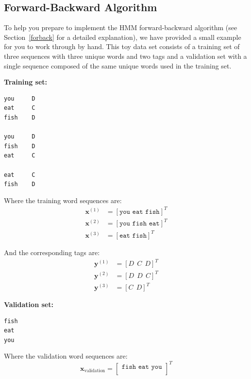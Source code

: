 \documentclass[11pt,addpoints,answers]{exam}
\begin{document}
\clearpage

\subsection{Forward-Backward Algorithm}

\begin{questions}  \label{hmm-problem}
\question[14] To help you prepare to implement the HMM forward-backward algorithm (see Section~\ref{forback} for a detailed explanation), we have provided a small example for you to work through by hand. This toy data set consists of a training set of three sequences with three unique words and two tags and a validation set with a single sequence composed of the same unique words used in the training set. 

\textbf{Training set:} 
\begin{verbatim}
you     D
eat     C
fish    D

you     D
fish    D
eat     C

eat     C
fish    D
\end{verbatim}

Where the training word sequences are:
\begin{align*}
    \mathbf{x}^{(1)} &= [\texttt{you eat fish}]^T \\
    \mathbf{x}^{(2)} &= [\texttt{you fish eat}]^T \\
    \mathbf{x}^{(3)} &= [\texttt{eat fish}]^T 
\end{align*}

And the corresponding tags are:
\begin{align*}
    \mathbf{y}^{(1)} &= [D~~C~~D]^T \\
    \mathbf{y}^{(2)} &= [D~~D~~C]^T \\
    \mathbf{y}^{(3)} &= [C~~D]^T
\end{align*}

\textbf{Validation set:}
\begin{verbatim}
fish
eat
you
\end{verbatim}

Where the validation word sequences are: 
$$
\mathbf{x}_{\text{validation}}= 
\begin{bmatrix}
\texttt{fish eat you}\\
\end{bmatrix}^T
$$


\end{questions}
\end{document}
